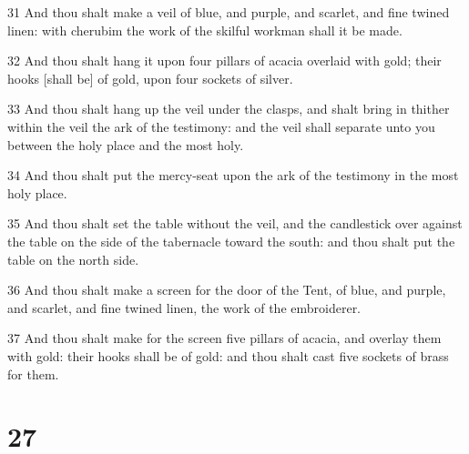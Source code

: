 \par 31 And thou shalt make a veil of blue, and purple, and scarlet, and fine twined linen: with cherubim the work of the skilful workman shall it be made.
\par 32 And thou shalt hang it upon four pillars of acacia overlaid with gold; their hooks [shall be] of gold, upon four sockets of silver.
\par 33 And thou shalt hang up the veil under the clasps, and shalt bring in thither within the veil the ark of the testimony: and the veil shall separate unto you between the holy place and the most holy.
\par 34 And thou shalt put the mercy-seat upon the ark of the testimony in the most holy place.
\par 35 And thou shalt set the table without the veil, and the candlestick over against the table on the side of the tabernacle toward the south: and thou shalt put the table on the north side.
\par 36 And thou shalt make a screen for the door of the Tent, of blue, and purple, and scarlet, and fine twined linen, the work of the embroiderer.
\par 37 And thou shalt make for the screen five pillars of acacia, and overlay them with gold: their hooks shall be of gold: and thou shalt cast five sockets of brass for them.

\chapter{27}


